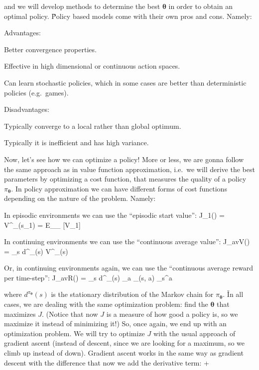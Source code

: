 and we will develop methods to determine the best $\boldsymbol{\theta}$ in order to obtain an optimal policy. \v

Policy based models come with their own pros and cons. Namely:
\bit
\item Advantages:
\bit
\item Better convergence properties.
\item Effective in high dimensional or continuous action spaces.
\item Can learn stochastic policies, which in some cases are better than deterministic policies (e.g.\ games).
\eit
\item Disadvantages:
\bit
\item Typically converge to a local rather than global optimum.
\item Typically it is inefficient and has high variance.
\eit
\eit

Now, let's see how we can optimize a policy! More or less, we are gonna follow the same approach as in value
function approximation, i.e.\ we will derive the best parameters by optimizing a cost function, that measures the
quality of a policy $\pi_{\boldsymbol{\theta}}$. In policy approximation we can have different forms of cost
functions depending on the nature of the problem. Namely:
\bit
\item In episodic environments we can use the ``episodic start value'':
\bse
J_1(\boldsymbol{\theta}) = V^{\pi_{\boldsymbol{\theta}}}(s_1) = E_{\pi_{\boldsymbol{\theta}}} [V_1]
\ese

\item In continuing environments we can use the ``continuous average value'':
\bse
J_{avV}(\boldsymbol{\theta}) = \sum_{s} d^{\pi_{\boldsymbol{\theta}}}(s) \cdot V^{\pi_{\boldsymbol{\theta}}}(s)
\ese

\item Or, in continuing environments again, we can use the ``continuous average reward per time-step'':
\bse
J_{avR}(\boldsymbol{\theta}) = \sum_{s} d^{\pi_{\boldsymbol{\theta}}}(s) \sum_{a}
\pi_{\boldsymbol{\theta}}(s, a) \cdot {}_{s}^{a}
\ese
\eit

where $d^{\pi_{\boldsymbol{\theta}}}(s)$ is the stationary distribution of the Markov chain for
$\pi_{\boldsymbol{\theta}}$. \v

In all cases, we are dealing with the same optimization problem: find the $\boldsymbol{\theta}$ that maximizes $J$.
(Notice that now $J$ is a measure of how good a policy is, so we maximize it instead of minimizing it!) So, once
again, we end up with an optimization problem. We will try to optimize $J$ with the usual approach of gradient
ascent (instead of descent, since we are looking for a maximum, so we climb up instead of down). Gradient ascent
works in the same way as gradient descent with the difference that now we add the derivative term:
\bse
\boldsymbol{\theta} \coloneqq \boldsymbol{\theta} + \alpha {}
\ese

